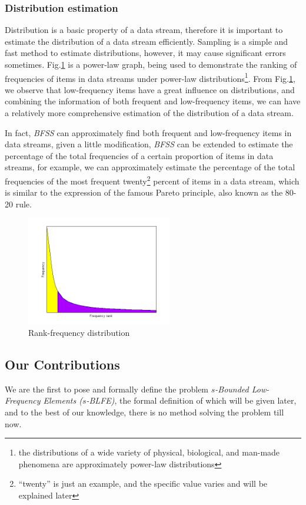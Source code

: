 \documentclass[conference]{IEEEtran}
\begin{document}
\subsubsection{Distribution estimation}\label{distribution estimation}
Distribution is a basic property of a data stream, therefore it is important to estimate the distribution of a data stream efficiently. Sampling is a simple and fast method to estimate distributions, however, it may cause significant errors sometimes. Fig.\ref{fig:sim} is a power-law graph, being used to demonstrate the ranking of frequencies of items in data streams under power-law distributions\footnote{the distributions of a wide variety of physical, biological, and man-made phenomena are approximately power-law distributions}. From Fig.\ref{fig:sim}, we observe that low-frequency items have a great influence on distributions, and combining the information of both frequent and low-frequency items, we can have a relatively more comprehensive estimation of the distribution of a data stream.\par 
In fact, \emph{BFSS} can approximately find both frequent and low-frequency items in data streams, given a little modification, \emph{BFSS} can be extended to estimate the percentage of the total frequencies of a certain proportion of items in data streams, for example, we can approximately estimate the percentage of the total frequencies of the most frequent twenty\footnote{``twenty'' is just an example, and the specific value varies and will be explained later} percent of items in a data stream, which is similar to the expression of the famous Pareto principle, also known as the 80-20 rule.

\begin{figure}
	\centering
	\includegraphics[width=2.5in]{png/zipf.png}
	\caption{Rank-frequency distribution}
	\label{fig:sim}
\end{figure}

\subsection{Our Contributions}
We are the first to pose and formally define the problem $s$\emph{-Bounded Low-Frequency Elements ($s$-BLFE)}, the formal definition of which will be given later, and to the best of our knowledge, there is no method solving the problem till now.\par
\end{document}
